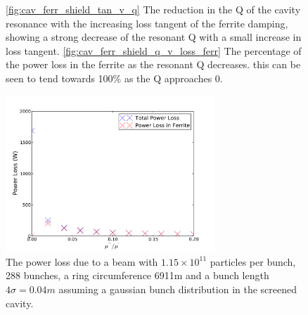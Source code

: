 \begin{figure}
\caption{\ref{fig:cav_ferr_shield_tan_v_q} The reduction in the Q of the cavity resonance with the increasing loss tangent of the ferrite damping, showing a strong decrease of the resonant Q with a small increase in loss tangent. \ref{fig:cav_ferr_shield_q_v_loss_ferr} The percentage of the power loss in the ferrite as the resonant Q decreases. this can be seen to tend towards 100\% as the Q approaches 0.}
\label{fig:screen_res_alterations}
\end{figure}

\begin{figure}
\begin{center}
\includegraphics[width=0.7\textwidth]{Beam_Coupling_Impedance_Reduction_Techniques/figures/screen_loss_tan_vs_power.pdf}
\end{center}
\caption{The power loss due to a beam with $1.15 \times 10^{11}$ particles per bunch, 288 bunches, a ring circumference 6911m and a bunch length $4\sigma = 0.04m$ assuming a gaussian bunch distribution in the screened cavity.}
\label{fig:screen_loss_tan_v_power}
\end{figure}

